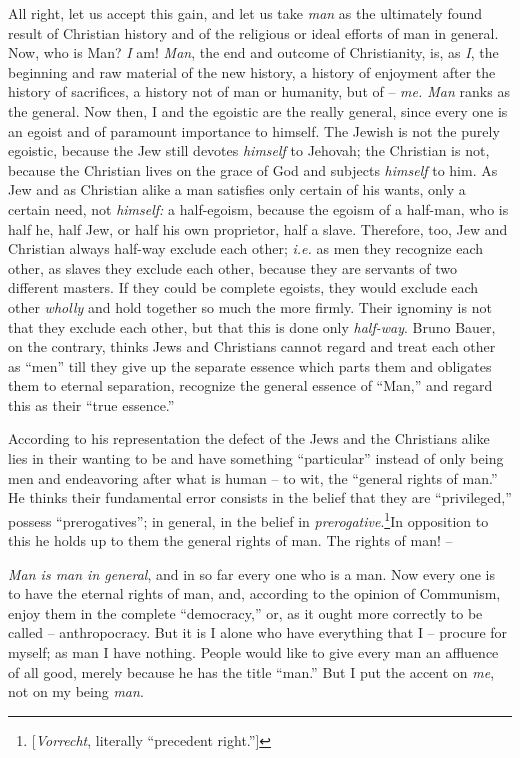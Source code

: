 All right, let us accept this gain, and let us take \textit{man} as the 
ultimately found result of Christian history and of the religious or ideal 
efforts of man in general. Now, who is Man? \textit{I} am! \textit{Man}, the 
end and outcome of Christianity, is, as \textit{I}, the beginning and raw 
material of the new history, a history of enjoyment after the history of 
sacrifices, a history not of man or humanity, but of -- \textit{me. Man} ranks 
as the general. Now then, I and the egoistic are the really general, since 
every one is an egoist and of paramount importance to himself. The Jewish is 
not the purely egoistic, because the Jew still devotes \textit{himself} to 
Jehovah; the Christian is not, because the Christian lives on the grace of God 
and subjects \textit{himself} to him. As Jew and as Christian alike a man 
satisfies only certain of his wants, only a certain need, not 
\textit{himself:} a half-egoism, because the egoism of a half-man, who is half 
he, half Jew, or half his own proprietor, half a slave. Therefore, too, Jew 
and Christian always half-way exclude each other; \textit{i.e.} as men they 
recognize each other, as slaves they exclude each other, because they are 
servants of two different masters. If they could be complete egoists, they 
would exclude each other \textit{wholly} and hold together so much the more 
firmly. Their ignominy is not that they exclude each other, but that this is 
done only \textit{half-way}. Bruno Bauer, on the contrary, thinks Jews and 
Christians cannot regard and treat each other as ``men'' till they give up 
the separate essence which parts them and obligates them to eternal 
separation, recognize the general essence of ``Man,'' and regard this as 
their ``true essence.''

According to his representation the defect of the Jews and the Christians 
alike lies in their wanting to be and have something ``particular'' instead 
of only being men and endeavoring after what is human -- to wit, the 
``general rights of man.'' He thinks their fundamental error consists in the 
belief that they are ``privileged,'' possess ``prerogatives''; in general, 
in the belief in \textit{prerogative}.\footnote{[\textit{Vorrecht}, literally 
``precedent right.''] }In opposition to this he holds up to them the general 
rights of man. The rights of man! --

\textit{Man is man in general}, and in so far every one who is a man. Now 
every one is to have the eternal rights of man, and, according to the opinion 
of Communism, enjoy them in the complete ``democracy,'' or, as it ought more 
correctly to be called -- anthropocracy. But it is I alone who have everything 
that I -- procure for myself; as man I have nothing. People would like to give 
every man an affluence of all good, merely because he has the title ``man.'' 
But I put the accent on \textit{me}, not on my being \textit{man}.

